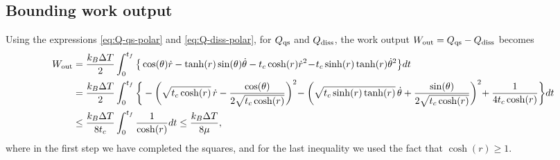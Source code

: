 \documentclass[
 reprint,
superscriptaddress,
 amsmath,amssymb,prl
 aps
]{revtex4-2}
\begin{document}
\begin{widetext}
    
    
    
    \section{Bounding work output}
    
    Using the expressions \eqref{eq:Q-qs-polar} and \eqref{eq:Q-diss-polar}, for $Q_{\rm qs}$ and $Q_{\rm diss}$, the work output
    $W_{\rm out}=Q_{\rm qs}-Q_{\rm diss}$ becomes
    \begin{align*}
       W_{\rm out}&=\frac{k_B\Delta T}{2}\int^{t_f}_0\big\{\cos(\theta) \dot{r}-   \tanh(r) \sin(\theta)\dot{\theta} -t_c\cosh(r)\dot{r}^2 \!-\! t_c\sinh(r) \tanh(r) \dot{\theta}^2\big\}dt\\
       &=\frac{k_B\Delta T}{2}\int^{t_f}_0\bigg\{-\bigg(\sqrt{t_c\cosh (r)}\, \dot{r}-\frac{\cos (\theta)}{2\sqrt{t_c\cosh (r)}}\bigg)^2\hspace{-2pt}-\bigg(\sqrt{t_c\sinh (r)\tanh (r)}\,\dot\theta+\frac{\sin (\theta)}{2\sqrt{t_c\cosh (r)}}\bigg)^2\hspace{-2pt}+\frac{1}{4 t_c \cosh (r)}\bigg\}dt\\
       &\leq \frac{k_B\Delta T}{8 t_c}\int^{t_f}_0\frac{1}{ \cosh (r)}dt\leq \frac{k_B\Delta T}{8 \mu},
    \end{align*}
   where in the first step we have completed the squares, and for the last inequality we used the fact that $\cosh (r)\geq 1$.
   

   \end{widetext}

    
    
    
\end{document}
